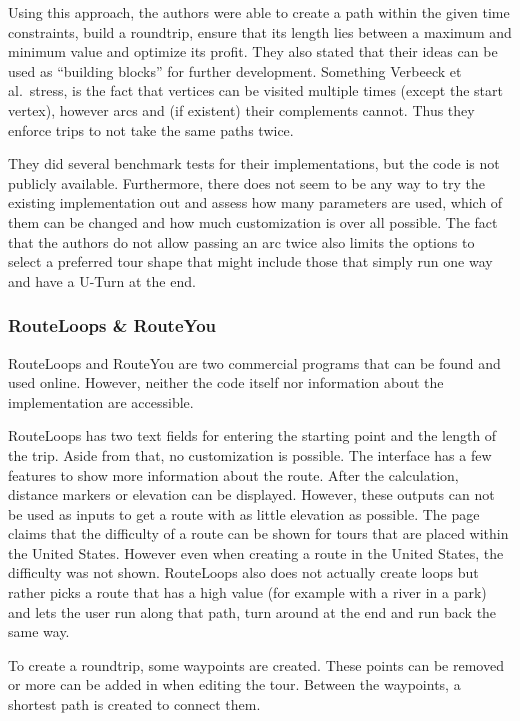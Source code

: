 Using this approach, the authors were able to create a path within the given time constraints, build a roundtrip, ensure that its length lies between a maximum and minimum value and optimize its profit.
They also stated that their ideas can be used as \enquote{building blocks}  \cite{verbeeck_extension_2014} for further development.
Something Verbeeck et al.\ stress, is the fact that vertices can be visited multiple times (except the start vertex), however arcs and (if existent) their complements cannot. 
Thus they enforce trips to not take the same paths twice.

They did several benchmark tests for their implementations, but the code is not publicly available.
Furthermore, there does not seem to be any way to try the existing implementation out and assess how many parameters are used, which of them can be changed and how much customization is over all possible.
The fact that the authors do not allow passing an arc twice also limits the options to select a preferred tour shape that might include those that simply run one way and have a U-Turn at the end. 


\subsubsection{RouteLoops \& RouteYou}
\label{subsubsec:routeLoopsrouteYou}

RouteLoops and RouteYou are two commercial programs that can be found and used online. 
However, neither the code itself nor information about the implementation are accessible.

RouteLoops has two text fields for entering the starting point and the length of the trip.
Aside from that, no customization is possible.
The interface has a few features to show more information about the route.
After the calculation, distance markers or elevation can be displayed.
However, these outputs can not be used as inputs to get a route with as little elevation as possible.
The page claims that the difficulty of a route can be shown for tours that are placed within the United States.
However even when creating a route in the United States, the difficulty was not shown. 
RouteLoops also does not actually create loops but rather picks a route that has a high value (for example with a river in a park) and lets the user run along that path, turn around at the end and run back the same way.

To create a roundtrip, some waypoints are created. 
These points can be removed or more can be added in when editing the tour.
Between the waypoints, a shortest path is created to connect them. 

